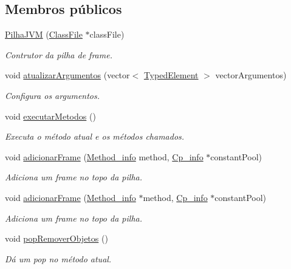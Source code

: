 \subsection*{Membros públicos}
\begin{DoxyCompactItemize}
\item 
\hyperlink{classPilhaJVM_a9acc6081073376a6f658c9dcfd3f6011}{Pilha\+J\+VM} (\hyperlink{classClassFile}{Class\+File} $\ast$class\+File)
\begin{DoxyCompactList}\small\item\em Contrutor da pilha de frame. \end{DoxyCompactList}\item 
void \hyperlink{classPilhaJVM_a43252c128cf31ac202373d6b66868a77}{atualizar\+Argumentos} (vector$<$ \hyperlink{BasicTypes_8h_a97b332303b1262282599e6ede0637b82}{Typed\+Element} $>$ vector\+Argumentos)
\begin{DoxyCompactList}\small\item\em Configura os argumentos. \end{DoxyCompactList}\item 
void \hyperlink{classPilhaJVM_a8c87f8255b289be137dd09360d135e86}{executar\+Metodos} ()
\begin{DoxyCompactList}\small\item\em Executa o método atual e os métodos chamados. \end{DoxyCompactList}\item 
void \hyperlink{classPilhaJVM_a9add990f9c258d39d2fcd791398c96ac}{adicionar\+Frame} (\hyperlink{structMethod__info}{Method\+\_\+info} method, \hyperlink{structCp__info}{Cp\+\_\+info} $\ast$constant\+Pool)
\begin{DoxyCompactList}\small\item\em Adiciona um frame no topo da pilha. \end{DoxyCompactList}\item 
void \hyperlink{classPilhaJVM_a6a47624a1e9923e59258454e6e6d1271}{adicionar\+Frame} (\hyperlink{structMethod__info}{Method\+\_\+info} $\ast$method, \hyperlink{structCp__info}{Cp\+\_\+info} $\ast$constant\+Pool)
\begin{DoxyCompactList}\small\item\em Adiciona um frame no topo da pilha. \end{DoxyCompactList}\item 
void \hyperlink{classPilhaJVM_a4f83f8d59b436cb1813a2a35e1538045}{pop\+Remover\+Objetos} ()
\begin{DoxyCompactList}\small\item\em Dá um pop no método atual. \end{DoxyCompactList}\end{DoxyCompactItemize}

